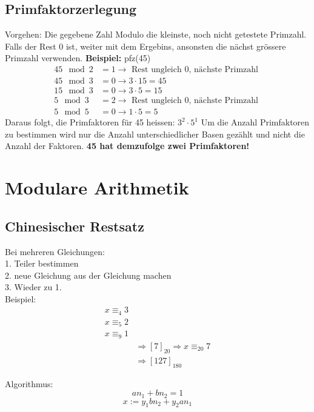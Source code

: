 \subsection{Primfaktorzerlegung} %
\label{sub:primfaktorzerlegung}
Vorgehen: Die gegebene Zahl Modulo die kleinste, noch nicht getestete Primzahl. Falls der Rest 0 ist, weiter mit dem Ergebins, ansonsten die nächst grössere Primzahl verwenden.\newline
\textbf{Beispiel:} pfz(45)
\begin{align*}
	45 \mod 2 &= 1 \rightarrow \text{ Rest ungleich 0, nächste Primzahl } \\
	45 \mod 3 &= 0 \rightarrow 3 \cdot 15 = 45 \\
	15 \mod 3 &= 0 \rightarrow 3 \cdot 5 = 15 \\
	5 \mod 3 &= 2  \rightarrow \text{ Rest ungleich 0, nächste Primzahl } \\
	5 \mod 5 &= 0 \rightarrow 1 \cdot 5 = 5
\end{align*}
Daraus folgt, die Primfaktoren für 45 heissen: \( 3^2 \cdot 5^1 \)\newline
Um die Anzahl Primfaktoren zu bestimmen wird nur die Anzahl unterschiedlicher Basen gezählt und nicht die Anzahl der Faktoren. \textbf{45 hat demzufolge zwei Primfaktoren!}

\section{Modulare Arithmetik} %
\label{sec:modulare_arihmetik}

\subsection{Chinesischer Restsatz}
Bei mehreren Gleichungen:\\
1. Teiler bestimmen\\
2. neue Gleichung aus der Gleichung machen\\
3. Wieder zu 1.\\
Beispiel:\\
\begin{align*}
	x \equiv_4 3\\
	x \equiv_5 2\\
	x \equiv_9 1\\
	&\Rightarrow [7]_{20} \Rightarrow x \equiv_20 7\\
	&\Rightarrow [127]_{180}
\end{align*}

Algorithmus:\\
$$an_1 + bn_2 =1$$
$$x := y_1 bn_2 + y_2an_1$$


